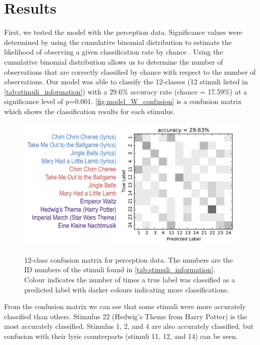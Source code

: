 \section{Results}
First, we tested the model with the perception data. 
Significance values were determined by using the cumulative binomial distribution to estimate the likelihood of observing a given classification rate by chance \cite{Combrisson2015}. 
Using the cumulative binomial distribution allows us to determine the number of observations that are correctly classified by chance with respect to the number of observations.
Our model was able to classify the 12-classes (12 stimuli listed in \autoref{tab:stimuli_information}) with a 29.6\% accuracy rate (chance = 17.59\%) at a significance level of p=0.001.
\autoref{fig:model_W_confusion} is a confusion matrix which shows the classification results for each stimulus.
\begin{figure}[htb] 
  \begin{center}
    \includegraphics[width=.75\textwidth,keepaspectratio=true]{Figures/model_W_confusion}
   \\\vspace{-0.8em}
    \caption{12-class confusion matrix for perception data. The numbers are the ID numbers of the stimuli found in \autoref{tab:stimuli_information}. Colour indicates the number of times a true label was classified as a predicted label with darker colours indicating more classifications.}
    \label{fig:model_W_confusion}
  \end{center}
\end{figure}
From the confusion matrix we can see that some stimuli were more accurately classified than others. 
Stimulus 22 (Hedwig's Theme from Harry Potter) is the most accurately classified. 
Stimulus 1, 2, and 4 are also accurately classified, but confusion with their lyric counterparts (stimuli 11, 12, and 14) can be seen.

